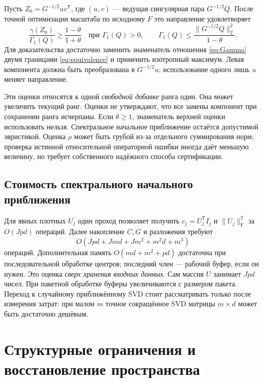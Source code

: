 \documentclass[11pt,a4paper]{article}
\numberwithin{equation}{section}
\theoremstyle{remark}
\newcommand{\T}{^{\mathsf T}}
\newcommand{\F}{_{\mathrm F}}
\begin{document}
Пусть $Z_0=G^{-1/2}uv\T$, где $(u,v)$ --- ведущая сингулярная пара
$G^{-1/2}Q$. После точной оптимизации масштаба по исходному $F$
это направление удовлетворяет
\begin{equation}\label{eq:proposalbound}
 \frac{\gamma(Z_0)}{\Gamma_1(Q)}\ge\frac{1-\theta}{1+\theta}
 \quad\text{при }\Gamma_1(Q)>0,
 \qquad
 \Gamma_1(Q)\le\frac{\|G^{-1/2}Q\|_2^2}{1-\theta}.
\end{equation}
Для доказательства достаточно заменить знаменатель отношения
\eqref{eq:Gamma} двумя границами \eqref{eq:equivalence} и применить
изотропный максимум. Левая компонента должна быть преобразована
в $G^{-1/2}u$; использование одного лишь $u$ меняет направление.

Эти оценки относятся к одной \emph{свободной добавке} ранга один.
Она может увеличить текущий ранг. Оценки не утверждают, что все замены
компонент при сохранении ранга исчерпаны.
Если $\theta\ge1$, знаменатель верхней оценки использовать нельзя.
Спектральное начальное приближение остаётся допустимой эвристикой.
Оценка $\rho$ может быть грубой из-за отдельного суммирования норм;
проверка истинной относительной операторной ошибки иногда даёт меньшую
величину, но требует собственного надёжного способа сертификации.

\subsection{Стоимость спектрального начального приближения}
Для явных плотных $U_j$ один проход позволяет получить
$c_j=U_j\T I_j$ и $\|U_j\|\F^2$ за $O(Jpd)$ операций.
Далее накопление $C,G$ и разложения требуют
\begin{equation}\label{eq:isocost}
 O(Jpd+Jmd+Jm^2+m^2d+m^3)
\end{equation}
операций. Дополнительная память $O(md+m^2+pd)$ достаточна при последовательной
обработке центров; последний член --- рабочий буфер, если он нужен.
Это оценка \emph{сверх хранения входных данных}. Сам массив $U$ занимает
$Jpd$ чисел. При пакетной обработке буферы увеличиваются с размером пакета.
Переход к случайному приближённому SVD стоит рассматривать только после
измерения затрат: при малом $m$ точное сокращённое SVD матрицы $m\times d$
может быть достаточно дешёвым.

\section{Структурные ограничения и восстановление пространства}\label{sec:limits}
\end{document}

